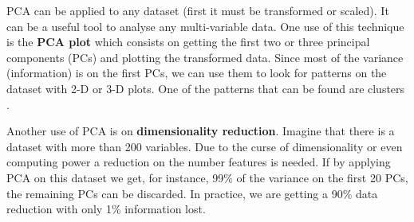 PCA can be applied to any dataset \cite{wold1987principal} (first it must be transformed or scaled). It can be a useful tool to analyse any multi-variable data. One use of this technique is the \textbf{PCA plot} which consists on getting the first two or three principal components (PCs) and plotting the transformed data. Since most of the variance (information) is on the first PCs, we can use them to look for patterns on the dataset with 2-D or 3-D plots. One of the patterns that can be found are clusters \cite{ding2004k}. 

Another use of PCA is on \textbf{dimensionality reduction}. Imagine that there is a dataset with more than 200 variables. Due to the curse of dimensionality \cite{Bellman:2010:DP:1893145} or even computing power a reduction on the number features is needed. If by applying PCA on this dataset we get, for instance, 99\% of the variance on the first 20 PCs, the remaining PCs can be discarded. In practice, we are getting a 90\% data reduction with only 1\% information lost.





